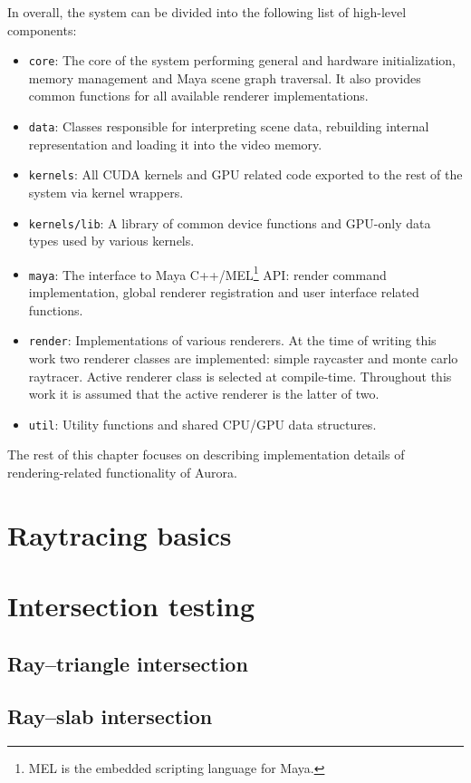In overall, the system can be divided into the following list of high-level components:
\begin{itemize}
\item \texttt{core}: The core of the system performing general and hardware initialization, memory management and Maya scene graph traversal. It also provides common functions for all available renderer implementations.
\item \texttt{data}: Classes responsible for interpreting scene data, rebuilding internal representation and loading it into the video memory.
\item \texttt{kernels}: All CUDA kernels and GPU related code exported to the rest of the system via kernel wrappers.
\item \texttt{kernels/lib}: A library of common device functions and GPU-only data types used by various kernels.
\item \texttt{maya}: The interface to Maya C++/MEL\footnote{MEL is the embedded scripting language for Maya.} API: render command implementation, global renderer registration and user interface related functions.
\item \texttt{render}: Implementations of various renderers. At the time of writing this work two renderer classes are implemented: simple raycaster and monte carlo raytracer. Active renderer class is selected at compile-time. Throughout this work it is assumed that the active renderer is the latter of two.
\item \texttt{util}: Utility functions and shared CPU/GPU data structures.
\end{itemize}

The rest of this chapter focuses on describing implementation details of rendering-related functionality of Aurora. \vfill

\section{Raytracing basics}

\section{Intersection testing}

\subsection{Ray--triangle intersection}

\subsection{Ray--slab intersection}

